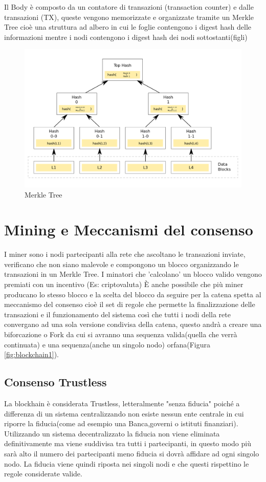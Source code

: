 \documentclass[12pt,titlepage]{report}
\begin{document}
Il Body è composto da un contatore di transazioni (transaction counter) e dalle transazioni (TX), queste vengono memorizzate e organizzate tramite un Merkle Tree cioè una struttura ad albero in cui le foglie contengono i digest hash delle informazioni mentre i nodi contengono i digest hash dei nodi sottostanti(figli)
\begin{figure}[h]
	\includegraphics[width=\textwidth]{Hash_Tree}
	\centering
	\caption{Merkle Tree}
	\label{fig:Tree1}
\end{figure}

\section{Mining e Meccanismi del consenso}
I miner sono i nodi partecipanti alla rete che  ascoltano le transazioni inviate, verificano che non siano malevole e compongono un blocco organizzando le transazioni in un Merkle Tree.
I minatori che 'calcolano' un blocco valido vengono premiati con un incentivo (Es: criptovaluta)
È anche possibile che più miner producano lo stesso blocco e la scelta del blocco da seguire per la catena spetta al meccanismo del consenso cioè  il set di regole che permette la finalizzazione delle transazioni e il funzionamento del sistema così che tutti i nodi della rete convergano ad una sola versione condivisa della catena, questo andrà a creare una biforcazione o Fork da cui si avranno una sequenza valida(quella che verrà continuata) e una sequenza(anche un singolo nodo) orfana(Figura \ref{fig:blockchain1}).

\subsection{Consenso Trustless}
La blockhain è considerata Trustless, letteralmente "senza fiducia" poiché a differenza di un sistema centralizzando non esiste nessun ente centrale in cui riporre la fiducia(come ad esempio una Banca,governi o istituti finanziari). Utilizzando un sistema decentralizzato la fiducia non viene eliminata definitivamente ma viene suddivisa tra tutti i partecipanti, in questo modo più sarà alto il numero dei partecipanti meno fiducia si dovrà affidare ad ogni singolo nodo. La fiducia viene quindi riposta nei singoli nodi e che questi rispettino le regole considerate valide.
\end{document}
